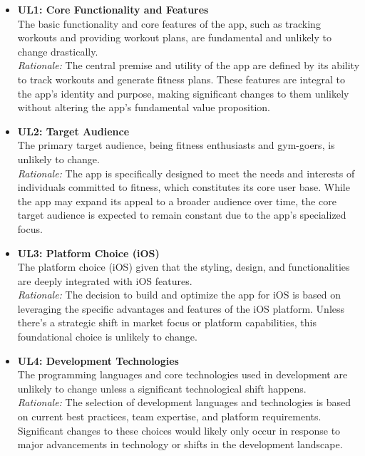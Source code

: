 \documentclass[12pt]{article}
\begin{document}
\begin{itemize}
    \item \textbf{UL1: Core Functionality and Features}\\
    The basic functionality and core features of the app, such as tracking workouts and providing workout plans, are fundamental and unlikely to change drastically.\\
    \textit{Rationale:} The central premise and utility of the app are defined by its ability to track workouts and generate fitness plans. These features are integral to the app's identity and purpose, making significant changes to them unlikely without altering the app's fundamental value proposition.

    \item \textbf{UL2: Target Audience}\\
    The primary target audience, being fitness enthusiasts and gym-goers, is unlikely to change.\\
    \textit{Rationale:} The app is specifically designed to meet the needs and interests of individuals committed to fitness, which constitutes its core user base. While the app may expand its appeal to a broader audience over time, the core target audience is expected to remain constant due to the app's specialized focus.

    \item \textbf{UL3: Platform Choice (iOS)}\\
    The platform choice (iOS) given that the styling, design, and functionalities are deeply integrated with iOS features.\\
    \textit{Rationale:} The decision to build and optimize the app for iOS is based on leveraging the specific advantages and features of the iOS platform. Unless there's a strategic shift in market focus or platform capabilities, this foundational choice is unlikely to change.

    \item \textbf{UL4: Development Technologies}\\
    The programming languages and core technologies used in development are unlikely to change unless a significant technological shift happens.\\
    \textit{Rationale:} The selection of development languages and technologies is based on current best practices, team expertise, and platform requirements. Significant changes to these choices would likely only occur in response to major advancements in technology or shifts in the development landscape.
\end{itemize}
\end{document}
